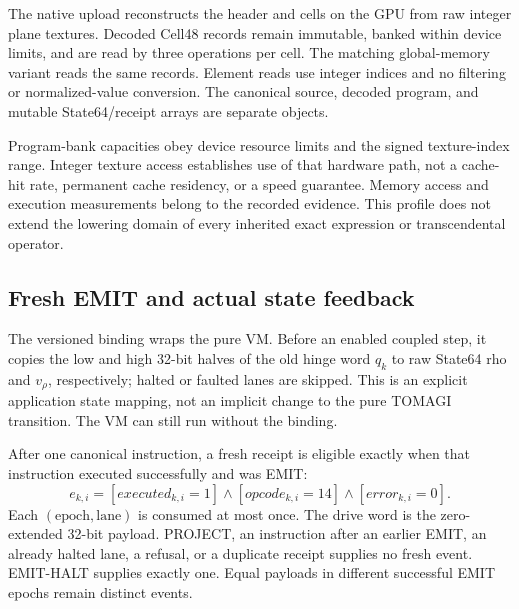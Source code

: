 The native upload reconstructs the header and cells on the GPU from
raw integer plane textures. Decoded Cell48 records remain immutable,
banked within device limits, and are read by three
 operations per cell. The matching global-memory
variant reads the same records. Element reads use integer indices and
no filtering or normalized-value conversion. The canonical source,
decoded program, and mutable State64/receipt arrays are separate objects.

Program-bank capacities obey device resource limits and the signed
texture-index range. Integer texture access establishes use of that
hardware path, not a cache-hit rate, permanent cache residency, or
a speed guarantee. Memory access and execution measurements belong
to the recorded evidence. This profile does not extend the lowering
domain of every inherited exact expression or transcendental operator.

\subsection{Fresh EMIT and actual state feedback}

The versioned binding  wraps the
pure VM. Before an enabled coupled step, it copies the low and high
32-bit halves of the old hinge word $q_k$ to raw State64 rho and
$v_\rho$, respectively; halted or faulted lanes are skipped. This is
an explicit application state mapping, not an implicit change to the
pure TOMAGI transition. The VM can still run without the binding.

After one canonical instruction, a fresh receipt is eligible exactly
when that instruction executed successfully and was EMIT:
\begin{equation}
 e_{k,i}=[executed_{k,i}=1]\land[opcode_{k,i}=14]
                  \land[error_{k,i}=0].
 \label{eq:r16-emission}
\end{equation}
Each $(\text{epoch},\text{lane})$ is consumed at most once. The drive
word is the zero-extended 32-bit payload. PROJECT, an instruction after
an earlier EMIT, an already halted lane, a refusal, or a duplicate
receipt supplies no fresh event. EMIT-HALT supplies exactly one.
Equal payloads in different successful EMIT epochs remain distinct events.

